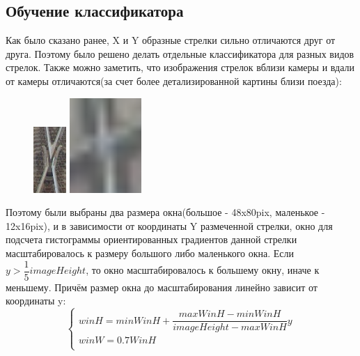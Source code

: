 \subsection{Обучение классификатора}
Как было сказано ранее, X и Y образные стрелки сильно отличаются друг от друга. Поэтому было решено делать отдельные классификатора для разных видов стрелок. Также можно заметить, что изображения стрелок вблизи камеры и вдали от камеры отличаются(за счет более детализированной картины близи поезда):
\begin{figure}[!h]
	\centering
	\begin{minipage}{0.3\textwidth}
		\centering
		\includegraphics[width=0.3\linewidth]{pictures/screenshot3}
		\caption[X]{}
		\label{fig:x}
	\end{minipage}
	\begin{minipage}{0.3\textwidth}
		\centering
		\includegraphics[width=0.3\linewidth]{pictures/screenshot5}
		\caption[Y]{}
		\label{fig:y}
	\end{minipage}
\end{figure}

Поэтому были выбраны два размера окна(большое - 48x80pix, маленькое - 12x16pix), и в зависимости от координаты Y размеченной стрелки, окно для подсчета гистограммы ориентированных градиентов данной стрелки масштабировалось к размеру большого либо маленького окна. Если $y > \dfrac{1}{5}imageHeight$, то окно масштабировалось к большему окну, иначе к меньшему. Причём  размер окна до масштабирования линейно зависит от координаты y:
\newline
\begin{equation}
\begin{cases}
winH = minWinH + \dfrac{maxWinH - minWinH}{imageHeight - maxWinH}y\\
winW = 0.7WinH\\
\end{cases}
\label{eq:windows}
\end{equation}

